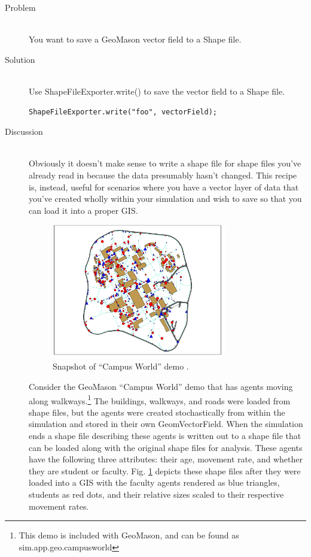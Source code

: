 \documentclass[twoside,10pt]{book}
\newcommand\file[1]{\textsf{#1}}
\newcommand\class[1]{\index{Classes!{#1}}\textsf{#1}}
\newcommand\code[1]{\textsf{#1}}
\begin{document}
\begin{description}
\item[Problem]~\\
You want to save a GeoMason vector field to a Shape file.

\item[Solution]~\\
Use \code{ShapeFileExporter.write()} to save the vector field to a Shape file.
\begin{verbatim}
ShapeFileExporter.write("foo", vectorField);
\end{verbatim}
\item[Discussion]~\\
Obviously it doesn't make sense to write a shape file for shape files
you've already read in because the data presumably hasn't changed.  This recipe is, instead, useful for scenarios
where you have a vector layer of data that you've created wholly
within your simulation and wish to save so that you can load it into a
proper GIS.  

\begin{figure}[ht]
  \centering
  \includegraphics[width=0.75\textwidth]{CampusWorld.pdf}
  \caption{Snapshot of ``Campus World'' demo .}
  \label{fig:campusworld}
\end{figure}

Consider the GeoMason ``Campus World'' demo that has
agents moving along walkways.\footnote{This demo is included with
  GeoMason, and can be found as \file{sim.app.geo.campusworld}}  The buildings, walkways, and roads were
loaded from shape files, but the agents were created stochastically
from within the simulation and stored in their own \class{GeomVectorField}.  When the simulation ends a shape file
describing these agents is written out to a shape file that can be
loaded along with the original shape files for analysis.  These agents
have the following three attributes: their age, movement rate, and whether they are
student or faculty. Fig. \ref{fig:campusworld} depicts these shape files
after they were loaded into a GIS with the faculty agents rendered as blue triangles, students as
red dots, and their relative sizes scaled to their respective movement rates.


\end{description}
\end{document}
